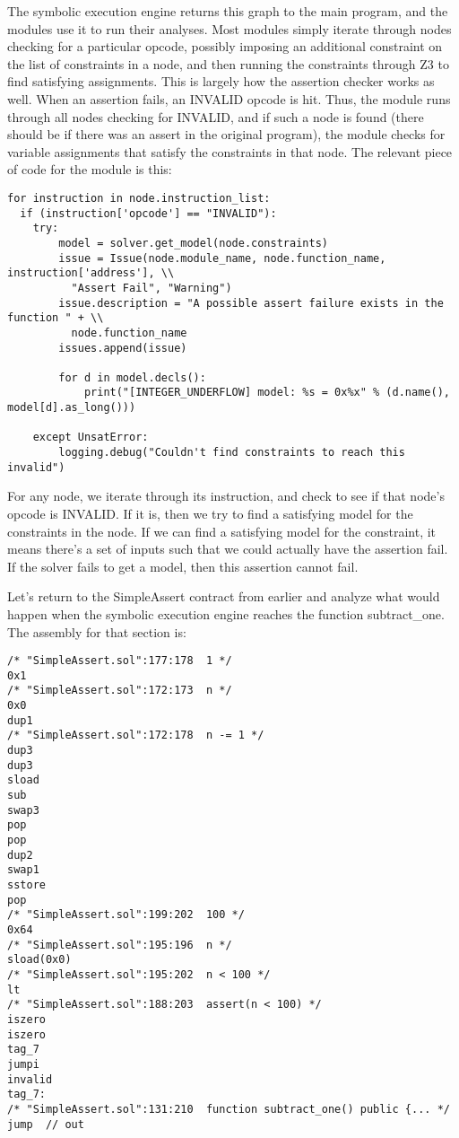 \documentclass[acmsmall]{acmart}\settopmatter{}
\begin{document}
The symbolic execution engine returns this graph to the main program, and the modules use it to run their analyses. Most modules simply iterate through nodes checking for a particular opcode, possibly imposing an additional constraint on the list of constraints in a node, and then running the constraints through Z3 to find satisfying assignments. This is largely how the assertion checker works as well. When an assertion fails, an INVALID opcode is hit. Thus, the module runs through all nodes checking for INVALID, and if such a node is found (there should be if there was an assert in the original program), the module checks for variable assignments that satisfy the constraints in that node. The relevant piece of code for the module is this:
\begin{verbatim}
for instruction in node.instruction_list:
  if (instruction['opcode'] == "INVALID"):
	try:
		model = solver.get_model(node.constraints)
		issue = Issue(node.module_name, node.function_name, instruction['address'], \\
		  "Assert Fail", "Warning")
		issue.description = "A possible assert failure exists in the function " + \\ 
		  node.function_name
		issues.append(issue)

		for d in model.decls():
			print("[INTEGER_UNDERFLOW] model: %s = 0x%x" % (d.name(), model[d].as_long()))

	except UnsatError:
		logging.debug("Couldn't find constraints to reach this invalid")
\end{verbatim}

For any node, we iterate through its instruction, and check to see if that node's opcode is INVALID. If it is, then we try to find a satisfying model for the constraints in the node. If we can find a satisfying model for the constraint, it means there's a set of inputs such that we could actually have the assertion fail. If the solver fails to get a model, then this assertion cannot fail.

Let's return to the SimpleAssert contract from earlier and analyze what would happen when the symbolic execution engine reaches the function subtract\_one. The assembly for that section is:

\begin{verbatim}
/* "SimpleAssert.sol":177:178  1 */
0x1
/* "SimpleAssert.sol":172:173  n */
0x0
dup1
/* "SimpleAssert.sol":172:178  n -= 1 */
dup3
dup3
sload
sub
swap3
pop
pop
dup2
swap1
sstore
pop
/* "SimpleAssert.sol":199:202  100 */
0x64
/* "SimpleAssert.sol":195:196  n */
sload(0x0)
/* "SimpleAssert.sol":195:202  n < 100 */
lt
/* "SimpleAssert.sol":188:203  assert(n < 100) */
iszero
iszero
tag_7
jumpi
invalid
tag_7:
/* "SimpleAssert.sol":131:210  function subtract_one() public {... */
jump  // out
\end{verbatim}
\end{document}
